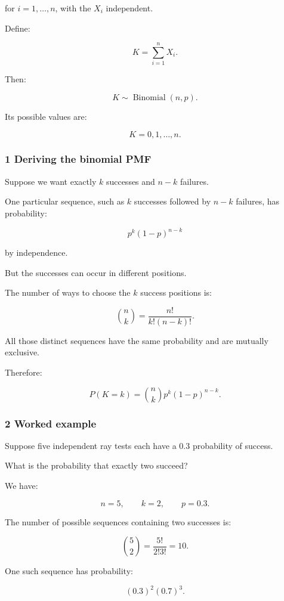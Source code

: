 for \(i=1,\ldots,n\), with the \(X_i\) independent.

Define:

\[
 K=\sum_{i=1}^nX_i.
\]

Then:

\[
 \boxed{K\sim\operatorname{Binomial}(n,p)}.
\]

Its possible values are:

\[
 K=0,1,\ldots,n.
\]

\subsubsection{1 Deriving the binomial PMF}\label{02-foundations-ii-ch023-deriving-the-binomial-pmf}

Suppose we want exactly \(k\) successes and \(n-k\) failures.

One particular sequence, such as \(k\) successes followed by \(n-k\) failures, has probability:

\[
 p^k(1-p)^{n-k}
\]

by independence.

But the successes can occur in different positions.

The number of ways to choose the \(k\) success positions is:

\[
 \binom nk= \frac{n!}{k!(n-k)!}.
\]

All those distinct sequences have the same probability and are mutually exclusive.

Therefore:

\[
 \boxed{ P(K=k) = \binom nkp^k(1-p)^{n-k} }.
\]

\subsubsection{2 Worked example}\label{02-foundations-ii-ch023-worked-example}

Suppose five independent ray tests each have a \(0.3\) probability of success.

What is the probability that exactly two succeed?

We have:

\[
 n=5,\qquad k=2,\qquad p=0.3.
\]

The number of possible sequences containing two successes is:

\[
 \binom52=\frac{5!}{2!3!}=10.
\]

One such sequence has probability:

\[
 (0.3)^2(0.7)^3.
\]


